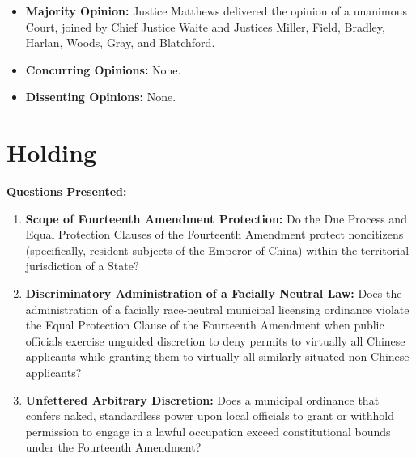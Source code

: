 \documentclass[12pt]{article}
\begin{document}
\begin{itemize}
    \item \textbf{Majority Opinion:} Justice Matthews delivered the opinion of a unanimous Court, joined by Chief Justice Waite and Justices Miller, Field, Bradley, Harlan, Woods, Gray, and Blatchford.
    \item \textbf{Concurring Opinions:} None.
    \item \textbf{Dissenting Opinions:} None.
\end{itemize}

\section{Holding}
\textbf{Questions Presented:}

\begin{enumerate}
    \item \textbf{Scope of Fourteenth Amendment Protection:} Do the Due Process and Equal Protection Clauses of the Fourteenth Amendment protect noncitizens (specifically, resident subjects of the Emperor of China) within the territorial jurisdiction of a State?
    \item \textbf{Discriminatory Administration of a Facially Neutral Law:} Does the administration of a facially race-neutral municipal licensing ordinance violate the Equal Protection Clause of the Fourteenth Amendment when public officials exercise unguided discretion to deny permits to virtually all Chinese applicants while granting them to virtually all similarly situated non-Chinese applicants?
    \item \textbf{Unfettered Arbitrary Discretion:} Does a municipal ordinance that confers naked, standardless power upon local officials to grant or withhold permission to engage in a lawful occupation exceed constitutional bounds under the Fourteenth Amendment?
\end{enumerate}
\end{document}
